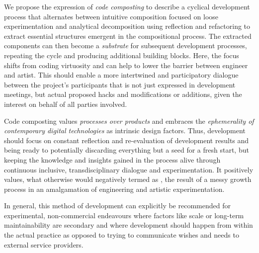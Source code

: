 We propose the expression of \emph{code composting} to describe a cyclical development process that alternates between intuitive composition focused on loose experimentation and analytical decomposition using reflection and refactoring to extract essential structures emergent in the compositional process.
The extracted components can then become a \emph{substrate} for subsequent development processes, repeating the cycle and producing additional building blocks.
Here, the focus shifts from coding virtuosity and can help to lower the barrier between engineer and artist.
This should enable a more intertwined and participatory dialogue between the project's participants that is not just expressed in development meetings, but actual proposed hacks and modifications or additions, given the interest on behalf of all parties involved.

Code composting values \emph{processes over products} and embraces the \emph{ephemerality of contemporary digital technologies} as intrinsic design factors.
Thus, development should focus on constant reflection and re-evaluation of development results and being ready to potentially discarding everything but a seed for a fresh start, but keeping the knowledge and insights gained in the process alive through continuous inclusive, transdisciplinary dialogue and experimentation.
It positively values, what otherwise would negatively termed as , the result of a messy growth process in an amalgamation of engineering and artistic experimentation.

In general, this method of development can explicitly be recommended for experimental, non-commercial endeavours where factors like scale or long-term maintainability are secondary and where development should happen from within the actual practice as opposed to trying to communicate wishes and needs to external service providers.
